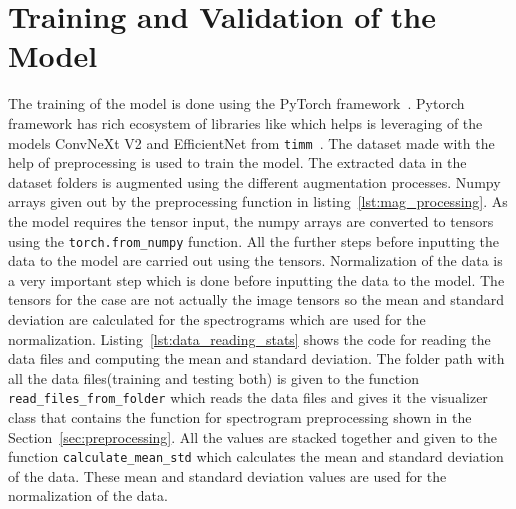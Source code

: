\section{Training and Validation of the Model}
The training of the model is done using the PyTorch framework~\cite{PyTorch_website}. Pytorch framework has rich ecosystem of libraries like which helps is leveraging of the models ConvNeXt V2 and EfficientNet from \texttt{timm}~\cite{rw2019timm}. The dataset made with the help of preprocessing is used to train the model. The extracted data in the dataset folders is augmented using the different augmentation processes. Numpy arrays given out by the preprocessing function in listing~\ref{lst:mag_processing}. As the model requires the tensor input, the numpy arrays are converted to tensors using the \texttt{torch.from\_numpy} function. All the further steps before inputting the data to the model are carried out using the tensors. Normalization of the data is a very important step which is done before inputting the data to the model. The tensors for the case are not actually the image tensors so the mean and standard deviation are calculated for the spectrograms which are used for the normalization. Listing~\ref{lst:data_reading_stats} shows the code for reading the data files and computing the mean and standard deviation. The folder path with all the data files(training and testing both) is given to the function \texttt{read\_files\_from\_folder} which reads the data files and gives it the visualizer class that contains the function for spectrogram preprocessing shown in the Section~\ref{sec:preprocessing}. All the values are stacked together and given to the function \texttt{calculate\_mean\_std} which calculates the mean and standard deviation of the data. These mean and standard deviation values are used for the normalization of the data.

